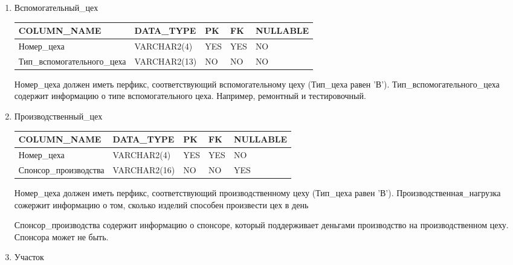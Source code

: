\begin{enumerate}
\begin{tabular}{|p{7cm}|p{9.3cm}|}
    \end{tabular}

    \item{Вспомогательный\_цех}

    \begin{tabular}{|p{7cm}|p{3cm}|p{1cm}|p{1cm}|p{3cm}|} \hline

        {\bf COLUMN\_NAME} & {\bf DATA\_TYPE} & {\bf PK} & {\bf FK} & {\bf NULLABLE} \\ \hline
        Номер\_цеха & VARCHAR2(4) & YES & YES & NO \\ \hline
        Тип\_вспомогательного\_цеха & VARCHAR2(13) & NO & NO & NO \\ \hline

    \end{tabular}

    Номер\_цеха должен иметь перфикс, соответствующий вспомогательному цеху (Тип\_цеха равен 'В').
    Тип\_вспомогательного\_цеха содержит информацию о типе вспомогательного цеха.
    Например, ремонтный и тестировочный.

    \item{Производственный\_цех}

    \begin{tabular}{|p{7cm}|p{3cm}|p{1cm}|p{1cm}|p{3cm}|} \hline

        {\bf COLUMN\_NAME} & {\bf DATA\_TYPE} & {\bf PK} & {\bf FK} & {\bf NULLABLE} \\ \hline
        Номер\_цеха & VARCHAR2(4) & YES & YES & NO \\ \hline
        Спонсор\_производства & VARCHAR2(16) & NO & NO & YES \\ \hline

    \end{tabular}

    Номер\_цеха должен иметь перфикс, соответствующий производственному цеху (Тип\_цеха равен 'В').
    Производственная\_нагрузка сожержит информацию о том, сколько изделий способен произвести цех в день

    Спонсор\_производства содержит информацию о спонсоре, который поддерживает деньгами производство на производственном цеху.
    Спонсора может не быть.

    \item{Участок}

    \begin{tabular}{|p{7cm}|p{3cm}|p{1cm}|p{1cm}|p{3cm}|} \hline


\end{tabular}
\end{enumerate}
